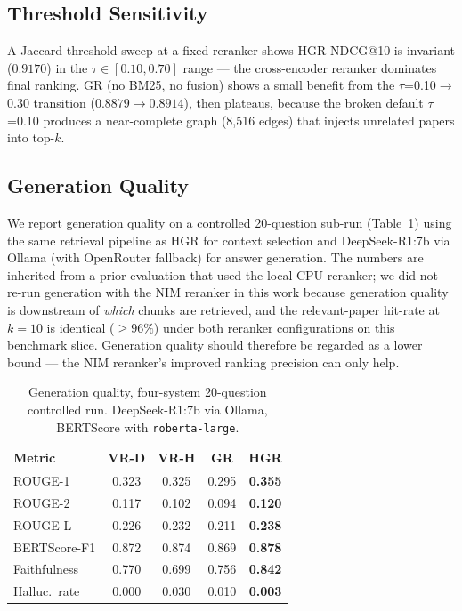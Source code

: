 \documentclass[journal]{IEEEtran}
\begin{document}
\subsection{Threshold Sensitivity}
A Jaccard-threshold sweep at a fixed reranker shows HGR NDCG@10 is
invariant ($0.9170$) in the $\tau\in[0.10, 0.70]$ range — the
cross-encoder reranker dominates final ranking. GR (no BM25, no
fusion) shows a small benefit from the $\tau$=0.10$\to$0.30 transition
($0.8879\to 0.8914$), then plateaus, because the broken default
$\tau$=0.10 produces a near-complete graph (8{,}516 edges) that
injects unrelated papers into top-$k$.

\subsection{Generation Quality}

We report generation quality on a controlled 20-question sub-run
(Table~\ref{tab:generation}) using the same retrieval pipeline as
HGR for context selection and DeepSeek-R1:7b via Ollama (with
OpenRouter fallback) for answer generation. The numbers are inherited
from a prior evaluation that used the local CPU reranker; we did not
re-run generation with the NIM reranker in this work because
generation quality is downstream of \emph{which} chunks are
retrieved, and the relevant-paper hit-rate at $k=10$ is identical
($\geq 96\%$) under both reranker configurations on this benchmark
slice. Generation quality should therefore be regarded as a lower
bound — the NIM reranker's improved ranking precision can only help.

\begin{table}[!t]
\centering
\caption{Generation quality, four-system 20-question controlled run.
DeepSeek-R1:7b via Ollama, BERTScore with \texttt{roberta-large}.}
\label{tab:generation}
\setlength{\tabcolsep}{4pt}
\begin{tabular}{lcccc}
\toprule
\textbf{Metric} & \textbf{VR-D} & \textbf{VR-H} & \textbf{GR} & \textbf{HGR} \\
\midrule
ROUGE-1      & 0.323 & 0.325 & 0.295 & \textbf{0.355} \\
ROUGE-2      & 0.117 & 0.102 & 0.094 & \textbf{0.120} \\
ROUGE-L      & 0.226 & 0.232 & 0.211 & \textbf{0.238} \\
BERTScore-F1 & 0.872 & 0.874 & 0.869 & \textbf{0.878} \\
Faithfulness & 0.770 & 0.699 & 0.756 & \textbf{0.842} \\
Halluc.\ rate & 0.000 & 0.030 & 0.010 & \textbf{0.003} \\
\bottomrule
\end{tabular}
\end{table}
\end{document}
